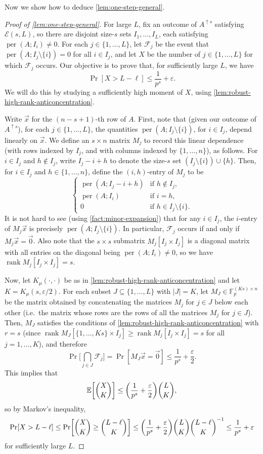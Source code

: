 \documentclass[10pt,reqno]{amsart}
\let\originalleft\left
\let\originalright\right
\renewcommand{\left}{\mathopen{}\mathclose\bgroup\originalleft}
\renewcommand{\right}{\aftergroup\egroup\originalright}
\numberwithin{equation}{section}
\theoremstyle{remark}
\newcommand{\mb}{\mathbb}
\newcommand{\mc}{\mathcal}
\newcommand{\on}{\operatorname}
\begin{document}
Now we show how to deduce \cref{lem:one-step-general}.
\begin{proof}[Proof of \cref{lem:one-step-general}]
    For large $L$, fix an outcome of $A^{\uparrow s}$ satisfying $\mc E(s,L)$, so there are disjoint size-$s$ sets $I_1,\dots,I_L$, each satisfying $\on{per}(A;I_i)\ne 0$. For each $j\in\{1,\dots,L\}$, let $\mathcal{F}_{j}$
be the event that $\on{per}(A;I_{j}\setminus\{i\})=0$ for all $i\in I_{j}$,
and let $X$ be the number of $j\in \{1,\dots,L\}$ for which $\mathcal{F}_{j}$ occurs.
Our objective is to prove that, for sufficiently large $L$, we have
\[
\Pr[X>L-\ell]\le\frac{1}{p^{s}}+\varepsilon.
\]
We will do this by studying a sufficiently high moment of $X$, using \cref{lem:robust-high-rank-anticoncentration}.

Write $\vec{x}$ for the $(n-s+1)$-th row of $A$. First, note that
(given our outcome of $A^{\uparrow s}$), for each $j\in\{1,\dots,L\}$,
the quantities $\on{per}(A;I_{j}\setminus\{i\})$, for $i\in I_{j}$,
depend linearly on $\vec{x}$. We define an $s\times n$ matrix $M_{j}$
to record this linear dependence (with rows indexed by
$I_{j}$, and with columns indexed by $\{1,\dots,n\}$),
as follows. For $i\in I_{j}$ and $h\notin I_{j}$, write $I_{j}-i+h$
to denote the size-$s$ set $(I_{j}\setminus\{i\})\cup\{h\}$. Then,
for $i\in I_{j}$ and $h\in\{1,\dots,n\}$, define the $(i,h)$-entry
of $M_{j}$ to be
\[
\begin{cases}
\on{per}(A;I_{j}-i+h) & \text{if }h\notin I_{j},\\
\on{per}(A;I_{i}) & \text{if }i=h,\\
0 & \text{if }h\in I_{j}\setminus\{i\}.
\end{cases}
\]
It is not hard to see (using \cref{fact:minor-expansion}) that for any $i\in I_j$, the $i$-entry of $M_{j}\vec{x}$
is precisely $\on{per}(A;I_{j}\setminus\{i\})$. In particular, $\mathcal{F}_{j}$ occurs if and
only if $M_{j}\vec{x}=\vec{0}$. Also note that the $s\times s$ submatrix $M_j[I_j\times I_j]$ is a diagonal matrix with all entries on the diagonal being $\on{per}(A;I_{i})\ne 0$, so we have $\on{rank} M_j[I_j\times I_j]=s$.

Now, let $K_\mu(\cdot,\cdot)$ be as in \cref{lem:robust-high-rank-anticoncentration} and let $K=K_\mu(s,\varepsilon/2)$. For
each subset $J\subseteq\{1,\dots,L\}$ with $|J|=K$, let $M_{J}\in\mb F_{p}^{(Ks)\times n}$
be the matrix obtained by concatenating the matrices $M_{j}$ for
$j\in J$ below each other (i.e.\ the matrix whose rows are the rows of all the matrices $M_{j}$ for
$j\in J$). Then, $M_{J}$ satisfies the conditions of \cref{lem:robust-high-rank-anticoncentration} with $r=s$ (since $\on{rank} M_J[\{1,\dots,Ks\}\times I_j]\ge \on{rank} M_j[I_j\times I_j]=s$ for all $j=1,\dots,K$), and therefore
\[
\Pr\Bigg[\bigcap_{j\in J}\mathcal{F}_{j}\Bigg]=\Pr[M_{J}\vec{x}=\vec{0}]\le\frac{1}{p^{s}}+\frac{\varepsilon}{2}.
\]
This implies that
\[
\mb E\left[\binom{X}{K}\right]\le\left(\frac{1}{p^{s}}+\frac{\varepsilon}{2}\right)\binom{L}{K},
\]
so by Markov's inequality,
\[
\Pr[X>L-\ell]\le\Pr\left[\binom{X}{K}\ge \binom{L-\ell}{K}\right]\le\left(\frac{1}{p^{s}}+\frac{\varepsilon}{2}\right)\binom{L}{K}\binom{L-\ell}{K}^{-1}\le\frac{1}{p^{s}}+\varepsilon
\]
for sufficiently large $L$.
\end{proof}



\end{document}
